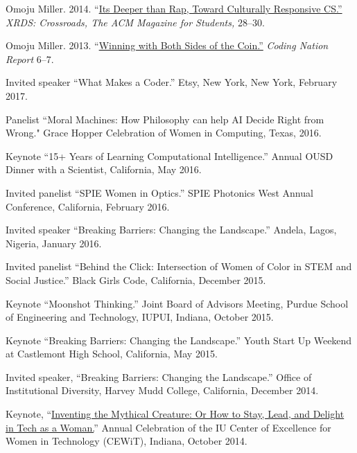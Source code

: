 \documentclass[11pt,article,oneside]{memoir}
\begin{document}
\ind Omoju Miller. 2014. ``\href{http://dl.acm.org/citation.cfm?id=2604994}{Its Deeper than Rap, Toward Culturally Responsive CS.'' }\emph{XRDS: Crossroads,  The ACM Magazine for Students, } 28--30.

\ind Omoju Miller. 2013. ``\href{http://kaporcenter.org/wp-content/uploads/2013/10/Kapor_CodingLandscape_R3.pdf}{Winning with Both Sides of the Coin.''} \emph{Coding Nation Report} 6--7.

 \bigskip


\medskip

\ind Invited speaker ``What Makes a Coder.'' Etsy, New York, New York, February 2017.

\ind Panelist ``Moral Machines: How Philosophy can help AI Decide Right from Wrong." Grace Hopper Celebration of Women in Computing, Texas, 2016.

\ind Keynote ``15+ Years of Learning Computational Intelligence.'' Annual OUSD Dinner with a Scientist, California, May 2016.

\ind Invited panelist ``SPIE Women in Optics.'' SPIE Photonics West Annual Conference, California, February 2016.

\ind Invited speaker ``Breaking Barriers: Changing the Landscape.'' Andela, Lagos, Nigeria, January 2016.

\ind Invited panelist ``Behind the Click: Intersection of Women of Color in STEM and Social Justice.'' Black Girls Code, California, December 2015.

\ind Keynote ``Moonshot Thinking.'' Joint Board of Advisors Meeting, Purdue School of Engineering and Technology, IUPUI, Indiana, October 2015.

\ind Keynote ``Breaking Barriers: Changing the Landscape.'' Youth Start Up Weekend at Castlemont High School, California, May 2015.

\ind Invited speaker, ``Breaking Barriers: Changing the Landscape.'' Office of Institutional Diversity, Harvey Mudd College, California, December 2014.

\ind Keynote, ``\href{https://www.youtube.com/watch?v=owXez6sIRbY&ab_channel=IUCEWIT}{Inventing the Mythical Creature: Or How to Stay, Lead, and Delight in Tech as a Woman.}'' Annual Celebration of the IU Center of Excellence for Women in Technology (CEWiT), Indiana, October 2014.
\end{document}
